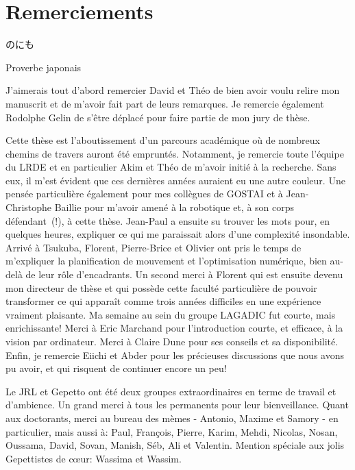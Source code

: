 \chapter*{Remerciements}\label{chap:merci}

\epigraph{\begin{CJK*}{UTF8}{min}%
    のにも%
\end{CJK*}}{Proverbe japonais}

J'aimerais tout d'abord remercier David et Théo de bien avoir voulu
relire mon manuscrit et de m'avoir fait part de leurs remarques. Je
remercie également Rodolphe Gelin de s'être déplacé pour faire partie
de mon jury de thèse.


Cette thèse est l'aboutissement d'un parcours académique où de
nombreux chemins de travers auront été empruntés. Notamment, je
remercie toute l'équipe du LRDE et en particulier Akim et Théo de
m'avoir initié à la recherche. Sans eux, il m'est évident que ces
dernières années auraient eu une autre couleur. Une pensée
particulière également pour mes collègues de GOSTAI et à
Jean-Christophe Baillie pour m'avoir amené à la robotique et, à son
corps défendant~(!), à cette thèse. Jean-Paul a ensuite su trouver les
mots pour, en quelques heures, expliquer ce qui me paraissait alors
d'une complexité insondable. Arrivé à Tsukuba, Florent, Pierre-Brice et
Olivier ont pris le temps de m'expliquer la planification de mouvement
et l'optimisation numérique, bien au-delà de leur rôle
d'encadrants. Un second merci à Florent qui est ensuite devenu mon
directeur de thèse et qui possède cette faculté particulière de
pouvoir transformer ce qui apparaît comme trois années difficiles en
une expérience vraiment plaisante. Ma semaine au sein du groupe
LAGADIC fut courte, mais enrichissante! Merci à Eric Marchand pour
l'introduction courte, et efficace, à la vision par ordinateur. Merci
à Claire Dune pour ses conseils et sa disponibilité. Enfin, je
remercie Eiichi et Abder pour les précieuses discussions que nous
avons pu avoir, et qui risquent de continuer encore un peu!


Le JRL et Gepetto ont été deux groupes extraordinaires en terme de
travail et d'ambience. Un grand merci à tous les permanents pour leur
bienveillance. Quant aux doctorants, merci au bureau des mèmes -
Antonio, Maxime et Samory - en particulier, mais aussi à: Paul,
François, Pierre, Karim, Mehdi, Nicolas, Nosan, Oussama, David, Sovan,
Manish, Séb, Ali et Valentin. Mention spéciale aux jolis Gepettistes
de c\oe ur: Wassima et Wassim.


